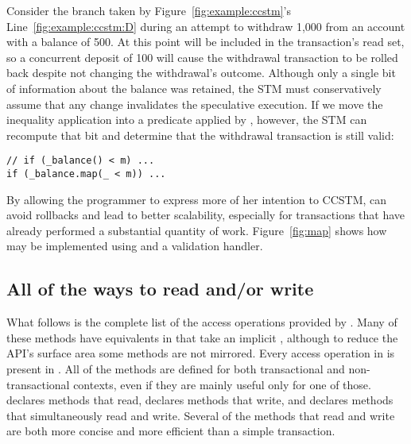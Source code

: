 Consider the branch taken by Figure~\ref{fig:example:ccstm}'s
Line~\ref{fig:example:ccstm:D} during an attempt to withdraw 1,000
 from an account with a balance of 500.  At this point
 will be included in the transaction's read set, so a
concurrent deposit of 100 will cause the withdrawal transaction to be
rolled back despite not changing the withdrawal's outcome.  Although only
a single bit of information about the balance was retained, the STM
must conservatively assume that any change invalidates the speculative
execution.  If we move the inequality application into a predicate
applied by , however, the STM can recompute that bit and
determine that the withdrawal transaction is still valid:
\lstset{numbers=none}
\begin{lstlisting}
// if (_balance() < m) ...
if (_balance.map(_ < m)) ...
\end{lstlisting}
\lstset{numbers=left}
By allowing the programmer to express more of her intention to CCSTM,
 can avoid rollbacks and lead to better scalability, especially for
transactions that have already performed a substantial quantity of work.
Figure~\ref{fig:map} shows how  may be implemented using
 and a validation handler.



\subsection{All of the ways to read and/or write}

What follows is the complete list of the access operations provided by
.  Many of these methods have equivalents in 
that take an implicit , although to reduce the API's surface
area some methods are not mirrored.  Every access operation in  is
present in .  All of the methods are defined
for both transactional and non-transactional contexts, even if they are
mainly useful only for one of those. 
 declares methods that
read,  declares methods that write, and 
declares methods that simultaneously read and write.
Several of the methods that read and write are both more concise and
more efficient than a simple transaction.

